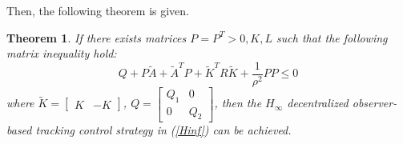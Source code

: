 \documentclass{ieeeaccess}
\newtheorem{theorem}{Theorem}
\begin{document}
Then, the following theorem is given.
\begin{theorem} \label{theorem1}
    If there exists matrices $P=P^T>0, K,L$ such that the following matrix inequality hold:
    \begin{equation} \label{BMI1}
        Q + P\tilde{A} + \tilde{A}^T P + \tilde{K}^TR\tilde{K} + \frac{1}{\rho^2}PP \leq 0
    \end{equation}
    where $\tilde{K}=\begin{bmatrix}
        K & -K
    \end{bmatrix}$, $Q=\begin{bmatrix}
        Q_1 & 0 \\ 0 & Q_2
    \end{bmatrix}$, then the $H_\infty$ decentralized observer-based tracking control strategy in (\ref{Hinf}) can be achieved.
\end{theorem}
\end{document}
